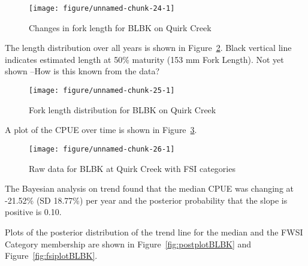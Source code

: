 \documentclass[]{article}\usepackage[]{graphicx}\usepackage[]{color}
\makeatletter
\def\maxwidth{ %
  \ifdim\Gin@nat@width>\linewidth
    \linewidth
  \else
    \Gin@nat@width
  \fi
}
\newenvironment{knitrout}{}{} %
\makeatother
\begin{document}
\begin{figure}[h]
\begin{center}
\begin{knitrout}
\color{fgcolor}
\texttt{[image: figure/unnamed-chunk-24-1]} 

\end{knitrout}
\end{center}
\caption{Changes in fork length for BLBK on Quirk Creek}
\label{fig:fishsummaryBLBK}
\end{figure}


\clearpage
The length distribution over all years is shown in Figure~\ref{fig:ldistBLBK}.
Black vertical line indicates estimated length at 50\% maturity (153 mm Fork Length).
{\Large Not yet shown --How is this known from the data? }


\begin{figure}[h]
\begin{center}
\begin{knitrout}
\color{fgcolor}
\texttt{[image: figure/unnamed-chunk-25-1]} 

\end{knitrout}
\end{center}
\caption{Fork length distribution for BLBK on Quirk Creek}
\label{fig:ldistBLBK}
\end{figure}


A plot of the CPUE over time is shown in Figure~\ref{fig:rawtrendBLBK}.

\begin{figure}[h]
\begin{center}
\begin{knitrout}
\color{fgcolor}
\texttt{[image: figure/unnamed-chunk-26-1]} 

\end{knitrout}
\end{center}
\caption{Raw data for BLBK at Quirk Creek with FSI categories}
\label{fig:rawtrendBLBK}
\end{figure}




The Bayesian analysis on trend found that the median CPUE was changing at 
-21.52\% (SD 18.77\%) per year
and the posterior probability that the slope is positive is  0.10.

Plots of the posterior distribution of the trend line for the median and the FWSI Category membership are shown in 
Figure~\ref{fig:postplotBLBK} and
Figure~\ref{fig:fsiplotBLBK}.
\end{document}
